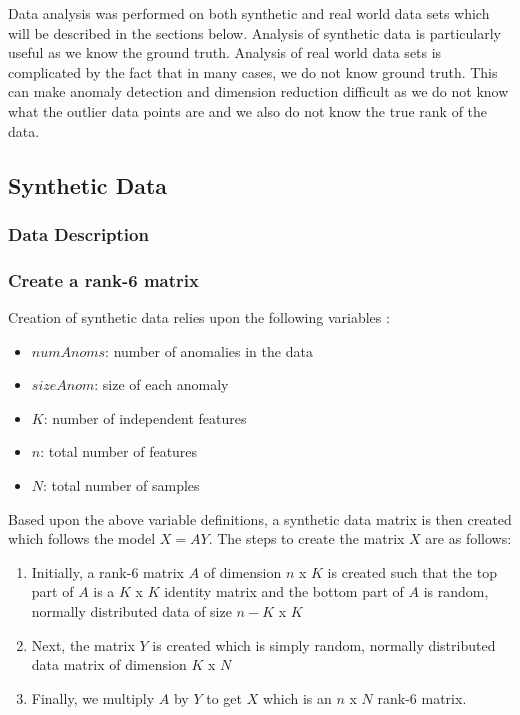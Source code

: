 \documentclass{article}
\begin{document}
Data analysis was performed on both synthetic and real world data sets which will be described in the sections below. Analysis of synthetic data is particularly useful as we know the ground truth. Analysis of real world data sets is complicated by the fact that in many cases, we do not know ground truth.  This can make anomaly detection and dimension reduction difficult as we do not know what the outlier data points are and we also do not know the true rank of the data. 

\subsection{Synthetic Data}



\subsubsection{Data Description}
\subsubsection{Create a rank-6 matrix}
Creation of synthetic data relies upon the following variables :
\begin{itemize}
\item $numAnoms$: number of anomalies in the data
\item $sizeAnom$: size of each anomaly
\item $K$: number of independent features
\item $n$: total number of features
\item $N$: total number of samples 
\end{itemize}

Based upon the above variable definitions, a synthetic data matrix is then created which follows the model $X=AY$. The steps to create the matrix $X$ are as follows:
\begin{enumerate}
\item Initially, a rank-6 matrix $A$ of dimension $n$ x $K$ is created such that the top part of $A$ is a $K$ x $K$ identity matrix and the bottom part of $A$ is random, normally distributed data of size $n-K$ x $K$
\item Next, the matrix $Y$ is created which is simply random, normally distributed data matrix of dimension $K$ x $N$
\item Finally, we multiply $A$ by $Y$ to get $X$ which is an $n$ x $N$ rank-6 matrix.
\end{enumerate}
\end{document}
